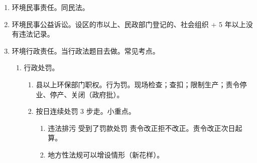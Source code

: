 \begin{enumerate}
\begin{enumerate}
\begin{enumerate}
                \end{enumerate}
          \item 生态。
                \begin{enumerate}
                  \item 生态红线。重点生态功能区、生态环境敏感区、脆弱区。
                  \item 保护生态多样性。外来物种引进，采取措施，防止破坏。
                  \item 生态保护补偿机制。跨省；加大转移支付；国家协商，受益地区和生态保护地区政府的补偿机制。
                \end{enumerate}
          \item 信息公开。国重大、省公报、县违法、重自己、见公征、审环评。
                \begin{enumerate}
                  \item 国务院 \yjt 重大。
                  \item 省 \yjt 公报、本省整体情况。
                  \item 县以上 \yjt 违法者名单。
                  \item 重点排污单位 \yjt 自己。
                  \item 建设单位 \yjt 公众、征求意见、说明情况。
                  \item 审批环评部门 \yjt 环评文件。
                \end{enumerate}
        \end{enumerate}
  \item 环境民事责任。同民法。
  \item 环境民事公益诉讼。设区的市以上、民政部门登记的、社会组织 + 5 年以上没有违法记录。
  \item 环境行政责任。当行政法题目去做。常见考点。
        \begin{enumerate}
          \item 行政处罚。
                \begin{enumerate}
                  \item 县以上环保部门职权。行为罚。现场检查；查扣；限制生产；责令停业、停产、关闭（政府批）。
                  \item 按日连续处罚 3 步走。小重点。
                        \begin{enumerate}
                          \item 违法排污 \yjt 受到了罚款处罚 \yjt 责令改正拒不改正。责令改正次日起算。
                          \item 地方性法规可以增设情形（\ydy 新花样）。

\end{enumerate}
\end{enumerate}
\end{enumerate}
\end{enumerate}
